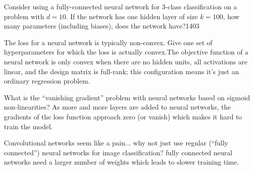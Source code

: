 \documentclass{article}
\def\red#1{{\color{red}#1}}
\begin{document}
{\item{Consider using a fully-connected neural network for 3-class classification on a problem with $d=10$. If the network has one hidden layer of size $k=100$, how many parameters (including biases), does the network have?}\red{1403}
\item{The loss for a neural network is typically non-convex. Give one set of hyperparameters for which the loss is actually convex.}\red{The objective function of a neural network is only convex when there are no hidden units, all activations are linear, and the design matrix is full-rank; this configuration means it's just an ordinary regression problem.}
\item What is the ``vanishing gradient'' problem with neural networks based on sigmoid non-linearities?
\red{As more and more layers are added to neural networks, the gradients of the loss function approach zero (or vanish) which makes it hard to train the model.}
\item{Convolutional networks seem like a pain... why not just use regular (``fully connected'') neural networks for image classification? \red{fully connected neural networks need a larger number of weights which leads to slower training time.}
}
}
\end{document}
